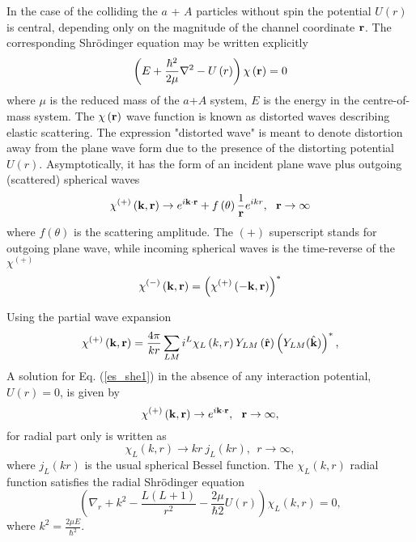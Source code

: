 \documentclass[
12pt, %
oneside, %
english, %
onehalfspacing, %
headsepline, %
]{MastersDoctoralThesis} %
\begin{document}
In the case of the colliding the  $a$ + $A$  particles without spin the potential $U\left( r \right)$ is central, depending only on the magnitude of the channel coordinate ${\bf r}$.
The corresponding Shr\"{o}dinger equation may be written explicitly
\begin{equation}
\left( E + \frac{\hbar^2}{2 \mu} {\bf \nabla}^2 - U \left( r \right) \right) 
\chi \left( {\bf r} \right) =0 
\label{es_she1}
\end{equation}
where $\mu$ is the reduced mass of the $a$+$A$ system, $E$ is the energy in the centre-of-mass system.
The $\chi \left( {\bf r} \right)$ wave function is known as distorted waves describing elastic scattering. The expression "distorted wave" is meant to denote distortion away from the plane wave form due to the presence   of the distorting potential $U \left( r \right)$. Asymptotically, it has the form of an incident plane wave plus outgoing (scattered) spherical waves
\begin{equation}
\chi^{(+)} \left( {\bf k}, {\bf r} \right) \rightarrow
e^{i {\bf k} \cdot {\bf r}} + f \left( \theta \right) \frac{1}{{\bf r}}
e^{i k r}, ~~  {\bf r} \rightarrow \infty
\label{es_chi_assymp_with_f}
\end{equation}
where $f \left( \theta \right)$ is the scattering amplitude. The $(+)$ superscript stands for outgoing plane wave, while incoming spherical waves is the time-reverse of the $\chi^{(+)}$
\begin{equation}
\chi^{(-)} \left( {\bf k}, {\bf r} \right) = 
\left( \chi^{(+)} \left(- {\bf k}, {\bf r} \right) \right)^{*}
\end{equation}

Using the partial wave expansion 
\begin{equation}
\chi^{(+)} \left( {\bf k}, {\bf r} \right) = 
\frac{4 \pi}{kr} \sum_{LM} i^{L} \chi_L \left( k,r \right) 
Y_{LM}\left( \hat{{\bf r}}\right) \left( Y_{LM}( \hat{{\bf k}})\right)^{*},
\end{equation}
A solution for Eq. (\ref{es_she1}) in the absence of any interaction potential, $U \left( r \right) = 0$, is given by 
\begin{equation}
\chi^{(+)} \left( {\bf k}, {\bf r} \right) \rightarrow
e^{i {\bf k} \cdot {\bf r}}, ~~ {\bf r} \rightarrow \infty, 
\end{equation}
for radial part only is written as
\begin{equation}
\chi_L \left( k,r \right)  \rightarrow kr~j_L \left(kr \right),
~~ r \rightarrow \infty,
\end{equation}
where $j_L \left(kr \right)$ is the usual spherical Bessel function. The $\chi_L \left( k,r \right)$ radial function satisfies the radial Shr\"{o}dinger equation
\begin{equation}
\left( \nabla_r + k^2 - \frac{L(L+1)}{r^2} - \frac{2 \mu}{\hbar2} U \left( r \right)\right) \chi_L \left( k,r \right) =0,
\label{es_she_radial}
\end{equation}
where $k^2 = \frac{2\mu E}{\hbar^2}$.
\end{document}
